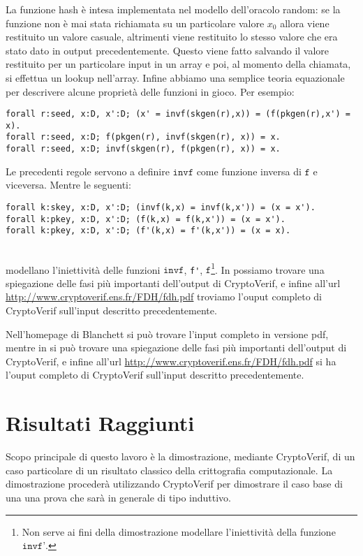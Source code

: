 \documentclass[a4paper,openright,twoside,12pt]{report}
\begin{document}
La funzione hash \`e intesa implementata nel modello dell'oracolo random: se la funzione non \`e mai stata richiamata su un particolare valore $x_0$ allora viene restituito un valore casuale, 
altrimenti viene restituito lo stesso valore che era stato dato in output precedentemente. Questo viene fatto salvando il valore restituito per un particolare input in un array e poi,
al momento della chiamata, si effettua un lookup nell'array.
Infine abbiamo una semplice teoria equazionale per descrivere alcune propriet\`a delle funzioni in gioco.
Per esempio:
\begin{verbatim}
forall r:seed, x:D, x':D; (x' = invf(skgen(r),x)) = (f(pkgen(r),x') = x).
forall r:seed, x:D; f(pkgen(r), invf(skgen(r), x)) = x.
forall r:seed, x:D; invf(skgen(r), f(pkgen(r), x)) = x.
\end{verbatim}
Le precedenti regole servono a definire $\texttt{invf}$ come funzione inversa di $\texttt{f}$ e viceversa. Mentre le seguenti:
\begin{verbatim}
forall k:skey, x:D, x':D; (invf(k,x) = invf(k,x')) = (x = x').
forall k:pkey, x:D, x':D; (f(k,x) = f(k,x')) = (x = x').
forall k:pkey, x:D, x':D; (f'(k,x) = f'(k,x')) = (x = x).
\end{verbatim}\\
modellano l'iniettivit\`a delle funzioni $\texttt{invf}$, \verb!f'!, $\texttt{f}$\footnote{Non serve ai fini della dimostrazione modellare l'iniettivit\`a della funzione $\texttt{invf'}$. }.
In \cite{BlanchetPointchevalCrypto06} possiamo trovare una spiegazione delle fasi pi\`u importanti dell'output di CryptoVerif, e infine all'url \url{http://www.cryptoverif.ens.fr/FDH/fdh.pdf} troviamo l'ouput completo di CryptoVerif sull'input descritto precedentemente.

Nell'homepage di Blanchett si pu\`o trovare l'input completo in versione pdf, mentre in  \cite{BlanchetPointchevalCrypto06} si pu\`o 
trovare una spiegazione delle fasi pi\`u importanti dell'output di CryptoVerif, e infine 
all'url \url{http://www.cryptoverif.ens.fr/FDH/fdh.pdf} si ha l'ouput completo di CryptoVerif sull'input descritto precedentemente.

\chapter{Risultati Raggiunti}
Scopo principale di questo lavoro \`e la dimostrazione, mediante CryptoVerif, di un caso particolare di un risultato classico della crittografia computazionale. 
La dimostrazione proceder\`a utilizzando CryptoVerif per dimostrare il caso base 
di una una prova che sar\`a in generale di tipo induttivo.
\end{document}
